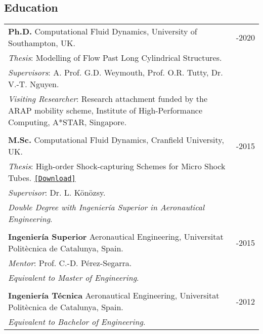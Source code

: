 \documentclass[line]{res}
\newenvironment{p3}
  {\begin{adjustwidth}{-16pt}{0pt}
  \vspace{3pt}}
  {\end{adjustwidth}}
\begin{document}
\begin{resume}
\section{Education}
\begin{p3}
\begin{tabular}{p{} >{\raggedleft\arraybackslash}p{}}
\textbf{Ph.D.} Computational Fluid Dynamics, University of Southampton, UK. &  2015-2020\\
\textit{Thesis}: Modelling of Flow Past Long Cylindrical Structures. & \\
\textit{Supervisors}: A. Prof. G.D. Weymouth, Prof. O.R. Tutty, Dr. V.-T. Nguyen. & \\
\textit{Visiting Researcher}: Research attachment funded by the ARAP mobility scheme, Institute of High-Performance Computing, A*STAR, Singapore. &  \\
\\
\textbf{M.Sc.} Computational Fluid Dynamics, Cranfield University, UK. &  2014-2015\\ 
\textit{Thesis}: High-order Shock-capturing Schemes for Micro Shock Tubes. \href{https://b-fg.github.io/thesis/Font_Garcia 2015 - High-order Shock-capturing Schemes for Micro Shock Tubes.pdf}{\texttt{[Download]}}& \\
\textit{Supervisor}: Dr. L. K\"{o}n\"{o}zsy. & \\
\textit{Double Degree with Ingenier\'{i}a Superior in Aeronautical Engineering}. & \\
\\
\textbf{Ingenier\'{i}a Superior} Aeronautical Engineering, Universitat Polit\`{e}cnica de Catalunya, Spain. &  2012-2015\\ 
\textit{Mentor}: Prof. C.-D. P\'{e}rez-Segarra. & \\
\textit{Equivalent to Master of Engineering}. & \\
\\
\textbf{Ingenier\'{i}a T\'{e}cnica} Aeronautical Engineering, Universitat Polit\`{e}cnica de Catalunya, Spain.&  2009-2012\\ 
\textit{Equivalent to Bachelor of Engineering}. & 
\end{tabular}
\end{p3}
 

\end{resume}
\end{document}
